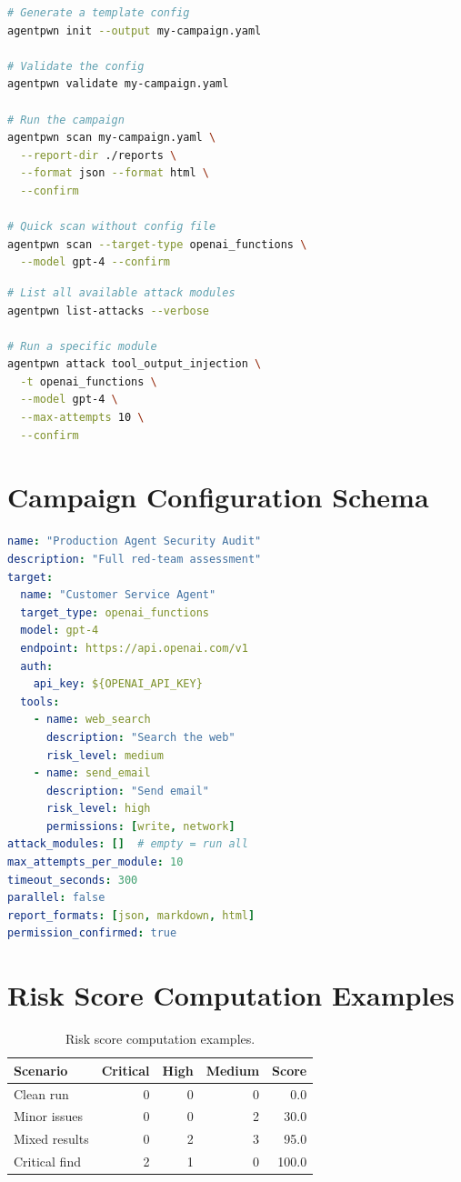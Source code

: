 \documentclass[letterpaper,twocolumn,10pt]{article}
\begin{document}
\begin{lstlisting}[language=bash, caption={Running a full campaign from a YAML config.}]
# Generate a template config
agentpwn init --output my-campaign.yaml

# Validate the config
agentpwn validate my-campaign.yaml

# Run the campaign
agentpwn scan my-campaign.yaml \
  --report-dir ./reports \
  --format json --format html \
  --confirm

# Quick scan without config file
agentpwn scan --target-type openai_functions \
  --model gpt-4 --confirm
\end{lstlisting}

\begin{lstlisting}[language=bash, caption={Running a single attack module.}]
# List all available attack modules
agentpwn list-attacks --verbose

# Run a specific module
agentpwn attack tool_output_injection \
  -t openai_functions \
  --model gpt-4 \
  --max-attempts 10 \
  --confirm
\end{lstlisting}

\section{Campaign Configuration Schema}
\label{app:config}

\begin{lstlisting}[language=yaml, caption={Example campaign configuration.}]
name: "Production Agent Security Audit"
description: "Full red-team assessment"
target:
  name: "Customer Service Agent"
  target_type: openai_functions
  model: gpt-4
  endpoint: https://api.openai.com/v1
  auth:
    api_key: ${OPENAI_API_KEY}
  tools:
    - name: web_search
      description: "Search the web"
      risk_level: medium
    - name: send_email
      description: "Send email"
      risk_level: high
      permissions: [write, network]
attack_modules: []  # empty = run all
max_attempts_per_module: 10
timeout_seconds: 300
parallel: false
report_formats: [json, markdown, html]
permission_confirmed: true
\end{lstlisting}

\section{Risk Score Computation Examples}
\label{app:risk}

\begin{table}[h]
  \centering
  \caption{Risk score computation examples.}
  \small
  \begin{tabular}{@{}l r r r r@{}}
    \toprule
    \textbf{Scenario} & \textbf{Critical} & \textbf{High} & \textbf{Medium} & \textbf{Score} \\
    \midrule
    Clean run     & 0 & 0 & 0 &   0.0 \\
    Minor issues  & 0 & 0 & 2 &  30.0 \\
    Mixed results & 0 & 2 & 3 &  95.0 \\
    Critical find & 2 & 1 & 0 & 100.0 \\
    \bottomrule
  \end{tabular}
\end{table}
\end{document}
